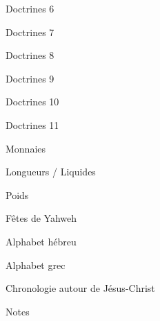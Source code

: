 \documentclass[11pt]{book}
\begin{document}
\begin{center}Doctrines 6\end{center}\clearpage
\begin{center}Doctrines 7\end{center}\clearpage
\begin{center}Doctrines 8\end{center}\clearpage
\begin{center}Doctrines 9\end{center}\clearpage
\begin{center}Doctrines 10\end{center}\clearpage
\begin{center}Doctrines 11\end{center}\clearpage
\clearpage
\begin{center}Monnaies\end{center}\clearpage
\clearpage
\begin{center}Longueurs / Liquides\end{center}\clearpage
\clearpage
\begin{center}Poids\end{center}\clearpage
\clearpage
\begin{center}Fêtes de Yahweh\end{center}\clearpage
\clearpage
\begin{center}Alphabet hébreu\end{center}\clearpage
\clearpage
\begin{center}Alphabet grec\end{center}\clearpage
\clearpage
\begin{center}Chronologie autour de Jésus-Christ\end{center}\clearpage
\makeatletter
\def\@oddhead{\hfil}
\def\@evenhead{\hfil}
\def\@oddfoot{\hfil}
\def\@evenfoot{\hfil}
\makeatother
\begin{center}Notes\end{center}\clearpage
\end{document}
